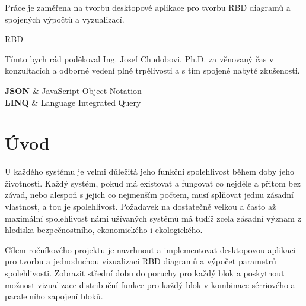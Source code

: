 \documentclass[FM,RP]{tulthesis}
\begin{document}
% 

\begin{abstractCZ}
    Práce je zaměřena na tvorbu desktopové aplikace pro tvorbu RBD diagramů a spojených výpočtů a vyzualizací.
\end{abstractCZ}

\begin{keywordsCZ}
    RBD
\end{keywordsCZ}

\vspace{2cm}



\clearpage

\begin{acknowledgement}
    Tímto bych rád poděkoval Ing. Josef Chudobovi, Ph.D. za věnovaný čas v konzultacích a odborné vedení plné trpělivosti a s tím spojené nabyté zkušenosti.
\end{acknowledgement}

\tableofcontents
\listoffigures

\clearpage

\begin{abbrList}
    \textbf{JSON} & JavaScript Object Notation \\
    \textbf{LINQ} & Language Integrated Query \\
   
\end{abbrList}

\chapter*{Úvod}
    U každého systému je velmi důležitá jeho funkční spolehlivost během doby jeho životnosti. Každý systém, pokud má existovat a fungovat co nejdéle a přitom bez závad,
    nebo alespoň s jejich co nejmenším počtem, musí splňovat jednu zásadní vlastnost, a tou je spolehlivost. 
    Požadavek na dostatečně velkou a často až maximální spolehlivost námi užívaných systémů má tudíž zcela zásadní význam z hlediska bezpečnostního, ekonomického i
    ekologického. 

    Cílem ročníkového projektu je navrhnout a implementovat desktopovou aplikaci pro tvorbu a jednoduchou vizualizaci RBD diagramů a výpočet parametrů spolehlivosti.
    Zobrazit střední dobu do poruchy pro každý blok a poskytnout možnost vizualizace distribuční funkce pro každý blok v kombinace sérriového a paralelního zapojení bloků.
\end{document}
